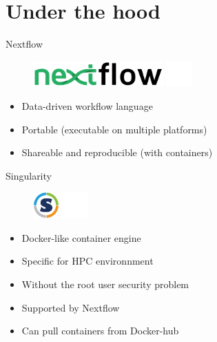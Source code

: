 \documentclass[usepdftitle=false]{beamer}
\begin{document}
\section{Under the hood}

\begin{frame}{Nextflow}
	\begin{figure}
		\includegraphics[height=1cm]{pictures/nextflow.png}
		\includegraphics[height=1cm]{pictures/blank}
	\end{figure}
	\begin{itemize}
		\item Data-driven workflow language
		\pause
		\item Portable (executable on multiple platforms)
		\pause
		\item Shareable and reproducible (with containers)
	\end{itemize}
	\vfill
\end{frame}

\begin{frame}{Singularity}
	\begin{figure}
		\includegraphics[height=1cm]{pictures/Singularity}
		\includegraphics[height=1cm]{pictures/blank}
	\end{figure}
	\begin{itemize}
		\item Docker-like container engine
		\item Specific for HPC environnment
		\pause
		\item Without the root user security problem
		\pause
		\item Supported by Nextflow
		\pause
		\item Can pull containers from Docker-hub
	\end{itemize}
\end{frame}
\end{document}
